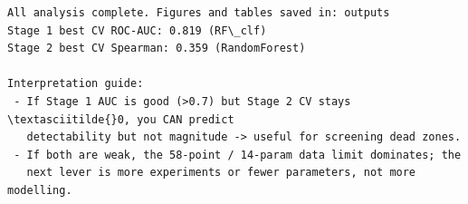 \documentclass[11pt]{article}
\begin{document}
    \begin{center}
    \end{center}
    { \hspace*{\fill} \\}
    
    \begin{center}
    \end{center}
    { \hspace*{\fill} \\}
    
    \begin{center}
    \end{center}
    { \hspace*{\fill} \\}
    
    \begin{center}
    \end{center}
    { \hspace*{\fill} \\}
    
    \begin{Verbatim}[commandchars=\\\{\}]

All analysis complete. Figures and tables saved in: outputs
Stage 1 best CV ROC-AUC: 0.819 (RF\_clf)
Stage 2 best CV Spearman: 0.359 (RandomForest)

Interpretation guide:
 - If Stage 1 AUC is good (>0.7) but Stage 2 CV stays \textasciitilde{}0, you CAN predict
   detectability but not magnitude -> useful for screening dead zones.
 - If both are weak, the 58-point / 14-param data limit dominates; the
   next lever is more experiments or fewer parameters, not more modelling.
    \end{Verbatim}
\end{document}
